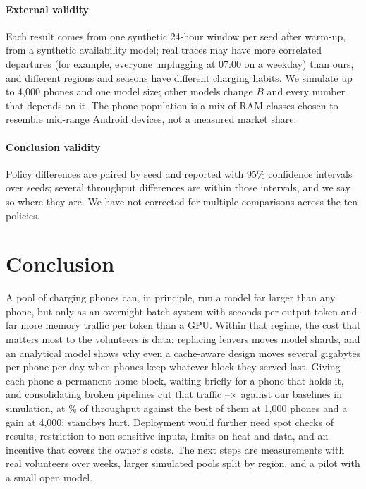 \documentclass[preprint,review,12pt,authoryear]{elsarticle}
\begin{document}
\paragraph{External validity} Each result comes from one synthetic 24-hour
window per seed after warm-up, from a synthetic availability model; real
traces may have more correlated departures (for example, everyone unplugging
at 07:00 on a weekday) than ours, and different regions and seasons have
different charging habits. We simulate up to 4,000 phones and one model size;
other models change $B$ and every number that depends on it. The phone
population is a mix of RAM classes chosen to resemble mid-range Android
devices, not a measured market share.

\paragraph{Conclusion validity} Policy differences are paired by seed and
reported with 95\% confidence intervals over \Seeds{} seeds; several
throughput differences are within those intervals, and we say so where they
are. We have not corrected for multiple comparisons across the ten policies.

\section{Conclusion}
\label{sec:conclusion}

A pool of charging phones can, in principle, run a model far larger than any
phone, but only as an overnight batch system with seconds per output token and
far more memory traffic per token than a GPU. Within that regime, the cost
that matters most to the volunteers is data: replacing leavers moves model
shards, and an analytical model shows why even a cache-aware design moves
several gigabytes per phone per day when phones keep whatever block they
served last. Giving each phone a permanent home block, waiting briefly for a
phone that holds it, and consolidating broken pipelines cut that traffic
\GBRatioBaseMin--\GBRatioBaseMax$\times$ against our baselines in simulation,
at \NSbehindConsolPct\% of throughput against the best of them at 1,000 phones
and a gain at 4,000; standbys hurt. Deployment would further need spot checks
of results, restriction to non-sensitive inputs, limits on heat and data, and
an incentive that covers the owner's costs. The next steps are measurements
with real volunteers over weeks, larger simulated pools split by region, and a
pilot with a small open model.
\end{document}
